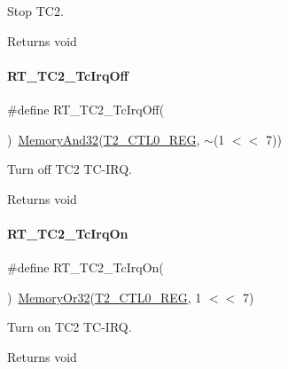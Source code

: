 Stop T\+C2. 

\begin{DoxyReturn}{Returns}
void 
\end{DoxyReturn}
\mbox{\label{a00083_a12e287a7ca5033554b5dc4693a231319}} 
\paragraph{\texorpdfstring{R\+T\+\_\+\+T\+C2\+\_\+\+Tc\+Irq\+Off}{RT\_TC2\_TcIrqOff}}
{\footnotesize\ttfamily \#define R\+T\+\_\+\+T\+C2\+\_\+\+Tc\+Irq\+Off(\begin{DoxyParamCaption}{ }\end{DoxyParamCaption})~\mbox{\hyperlink{a00026_ad87cedffcaadc51db22594fce55173d4}{Memory\+And32}}(\mbox{\hyperlink{a00026_a5853553391e986211306d4f29ab31e47}{T2\+\_\+\+C\+T\+L0\+\_\+\+R\+EG}}, $\sim$(1 $<$$<$ 7))}



Turn off T\+C2 T\+C-\/\+I\+RQ. 

\begin{DoxyReturn}{Returns}
void 
\end{DoxyReturn}
\mbox{\label{a00083_a0d385385ff809f653b9e7a6d6a111838}} 
\paragraph{\texorpdfstring{R\+T\+\_\+\+T\+C2\+\_\+\+Tc\+Irq\+On}{RT\_TC2\_TcIrqOn}}
{\footnotesize\ttfamily \#define R\+T\+\_\+\+T\+C2\+\_\+\+Tc\+Irq\+On(\begin{DoxyParamCaption}{ }\end{DoxyParamCaption})~\mbox{\hyperlink{a00026_a27874a97deab7cecdde5ddecf466e31e}{Memory\+Or32}}(\mbox{\hyperlink{a00026_a5853553391e986211306d4f29ab31e47}{T2\+\_\+\+C\+T\+L0\+\_\+\+R\+EG}}, 1 $<$$<$ 7)}



Turn on T\+C2 T\+C-\/\+I\+RQ. 

\begin{DoxyReturn}{Returns}
void 
\end{DoxyReturn}
\mbox{\label{a00083_a4328299fe0323ef75508eadf9b937ba1}} 
